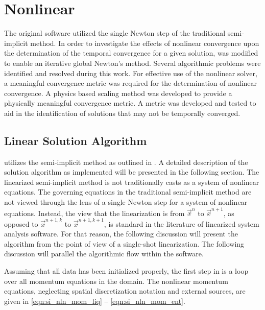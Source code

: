 \chapter{Nonlinear \cobra{}}
\label{chap:nln_solver}
The original \cobra{} software utilized the single Newton step of the traditional semi-implicit method.
In order to investigate the effects of nonlinear convergence upon the determination of the temporal convergence for a given solution, \cobra{} was modified to enable an iterative global Newton's method.
Several algorithmic problems were identified and resolved during this work.
For effective use of the nonlinear solver, a meaningful convergence metric was required for the determination of nonlinear convergence.
A physics based scaling method was developed to provide a physically meaningful convergence metric.
A metric was developed and tested to aid in the identification of solutions that may not be temporally converged.

\section{Linear Solution Algorithm}
\label{sect:linCobraAlg}

\cobra{} utilizes the semi-implicit method as outlined in .
A detailed description of the solution algorithm as implemented will be presented in the following section.
The linearized semi-implicit method is not traditionally casts as a system of nonlinear equations.
The governing equations in the traditional semi-implicit method are not viewed through the lens of a single Newton step for a system of nonlinear equations.
Instead, the view that the linearization is from $\vec{x}^{n}$ to $\vec{x}^{n+1}$, as opposed to $\vec{x}^{n+1, k}$ to $\vec{x}^{n+1, k+1}$, is standard in the literature of linearized system analysis software.
For that reason, the following discussion will present the algorithm from the point of view of a single-shot linearization.
The following discussion will parallel the algorithmic flow within the \cobra{} software.

Assuming that all data has been initialized properly, the first step in \cobra{} is a loop over all momentum equations in the domain.
The nonlinear momentum equations, neglecting spatial discretization notation and external sources, are given in \eqref{eqn:si_nln_mom_liq} -- \eqref{eqn:si_nln_mom_ent}.

